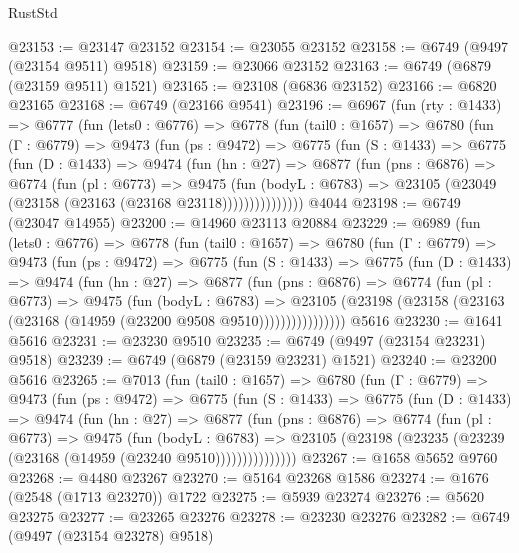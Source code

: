 \begin{lexlean}{RustStd}
\begin{coremodule}
@23153 := @23147 @23152
@23154 := @23055 @23152
@23158 := @6749 (@9497 (@23154 @9511) @9518)
@23159 := @23066 @23152
@23163 := @6749 (@6879 (@23159 @9511) @1521)
@23165 := @23108 (@6836 @23152)
@23166 := @6820 @23165
@23168 := @6749 (@23166 @9541)
@23196 := @6967
    (fun (rty : @1433) =>
    @6777
      (fun (lets0 : @6776) =>
      @6778
        (fun (tail0 : @1657) =>
        @6780
          (fun (Γ : @6779) =>
          @9473
            (fun (ps : @9472) =>
            @6775
              (fun (S : @1433) =>
              @6775
                (fun (D : @1433) =>
                @9474
                  (fun (hn : @27) =>
                  @6877
                    (fun (pns : @6876) =>
                    @6774
                      (fun (pl : @6773) =>
                      @9475
                        (fun (bodyL : @6783) =>
                        @23105 (@23049 (@23158 (@23163 (@23168 @23118)))))))))))))))
    @4044
@23198 := @6749 (@23047 @14955)
@23200 := @14960 @23113 @20884
@23229 := @6989
    (fun (lets0 : @6776) =>
    @6778
      (fun (tail0 : @1657) =>
      @6780
        (fun (Γ : @6779) =>
        @9473
          (fun (ps : @9472) =>
          @6775
            (fun (S : @1433) =>
            @6775
              (fun (D : @1433) =>
              @9474
                (fun (hn : @27) =>
                @6877
                  (fun (pns : @6876) =>
                  @6774
                    (fun (pl : @6773) =>
                    @9475
                      (fun (bodyL : @6783) =>
                      @23105
                        (@23198 (@23158 (@23163 (@23168 (@14959 (@23200 @9508 @9510))))))))))))))))
    @5616
@23230 := @1641 @5616
@23231 := @23230 @9510
@23235 := @6749 (@9497 (@23154 @23231) @9518)
@23239 := @6749 (@6879 (@23159 @23231) @1521)
@23240 := @23200 @5616
@23265 := @7013
    (fun (tail0 : @1657) =>
    @6780
      (fun (Γ : @6779) =>
      @9473
        (fun (ps : @9472) =>
        @6775
          (fun (S : @1433) =>
          @6775
            (fun (D : @1433) =>
            @9474
              (fun (hn : @27) =>
              @6877
                (fun (pns : @6876) =>
                @6774
                  (fun (pl : @6773) =>
                  @9475
                    (fun (bodyL : @6783) =>
                    @23105 (@23198 (@23235 (@23239 (@23168 (@14959 (@23240 @9510)))))))))))))))
@23267 := @1658 @5652 @9760
@23268 := @4480 @23267
@23270 := @5164 @23268 @1586
@23274 := @1676 (@2548 (@1713 @23270)) @1722
@23275 := @5939 @23274
@23276 := @5620 @23275
@23277 := @23265 @23276
@23278 := @23230 @23276
@23282 := @6749 (@9497 (@23154 @23278) @9518)

\end{coremodule}
\end{lexlean}
